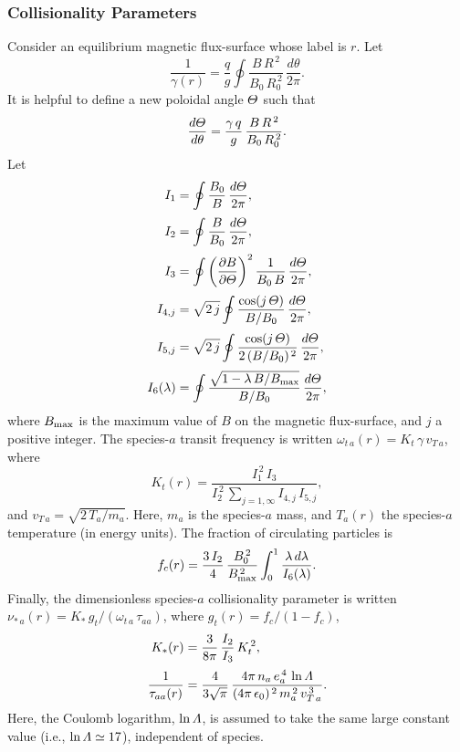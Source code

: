 \documentclass[12pt,prb,aps]{revtex4-1}
\begin{document}
\subsubsection{Collisionality Parameters}
Consider an equilibrium magnetic flux-surface whose label is $r$. 
Let
\begin{equation}
\frac{1}{\gamma(r)} =\frac{q}{g}\oint\frac{ B\,R^{\,2}}{B_0\,R_0^{\,2}}\,\frac{d\theta}{2\pi}.
\end{equation}
It is helpful to define a new poloidal angle ${\mit\Theta}$ such that
\begin{equation}
\frac{d{\mit\Theta}}{d\theta} = \frac{\gamma\,q}{g}\,\frac{B\,R^{\,2}}{B_0\,R_0^{\,2}}.
\end{equation}
Let
\begin{align}
I_1 &=\oint \frac{B_0}{B}\,\frac{d{\mit\Theta}}{2\pi},\\[0.5ex]
I_2 &=\oint \frac{B}{B_0}\,\frac{d{\mit\Theta}}{2\pi},\\[0.5ex]
I_3 &=\oint\left(\frac{\partial B}{\partial{\mit\Theta}}\right)^2\frac{1}{B_0\,B}\,\frac{d{\mit\Theta}}{2\pi},\\[0.5ex]
I_{4,j}&= \sqrt{2\,j}\oint\frac{\cos(j\,{\mit\Theta})}{B/B_0}\,\frac{d{\mit\Theta}}{2\pi},\\[0.5ex]
I_{5,j} &= \sqrt{2\,j}\oint\frac{\cos(j\,{\mit\Theta})}{2\,(B/B_0)^{\,2}}\,\frac{d{\mit\Theta}}{2\pi},\\[0.5ex]
I_6(\lambda) &=\oint \frac{\sqrt{1-\lambda\,B/B_{\rm max}}}{B/B_0}\,\frac{d{\mit\Theta}}{2\pi},
\end{align}
where $B_{\rm max}$ is the maximum value of $B$ on the magnetic
flux-surface, and $j$ a positive integer. 
The species-$a$ transit frequency is written
$\omega_{t\,a}(r)= K_t\,\gamma\,v_{T\,a}$,
where 
\begin{equation}\label{cdef}
K_t(r) = \frac{I_1^{\,2}\,I_3}{I_2^{\,2}\,\sum_{j=1,\infty} I_{4,j}\,I_{5,j}},
\end{equation}
and $v_{T\,a} = \sqrt{2\,T_a/m_a}$.  Here, $m_a$ is the
species-$a$ mass, and $T_a(r)$ the species-$a$ temperature (in energy units). The fraction of circulating particles 
is
\begin{equation}
f_c(r) = \frac{3\,I_2}{4}\,\frac{B_0^{\,2}}{B_{\rm max}^{\,2}}
\int_0^1 \frac{\lambda\,d\lambda}{I_6(\lambda)}.
\end{equation}
Finally, the dimensionless species-$a$ collisionality parameter
is written
$\nu_{\ast\,a} (r)= K_\ast\,g_t/(\omega_{t\,a}\,\tau_{aa})$,
where 
$g_t(r) =f_c/(1-f_c)$,
\begin{align}
K_\ast(r) &= \frac{3}{8\pi}\,\frac{I_2}{I_3}\,K_t^{\,2},\\[0.5ex]
\frac{1}{\tau_{aa}(r)}&= \frac{4}{3\sqrt{\pi}}\,\frac{4\pi\,n_a\,e_a^{\,4}\,\ln{\mit\Lambda}}{(4\pi\,\epsilon_0)^{\,2}\,m_a^{\,2}\,v_{T\,a}^{\,3}}.
\end{align}
Here, the Coulomb logarithm, $\ln{\mit\Lambda}$, is assumed to take the same large constant value (i.e., $\ln{\mit\Lambda}\simeq 17$), 
independent of species. 
\end{document}
